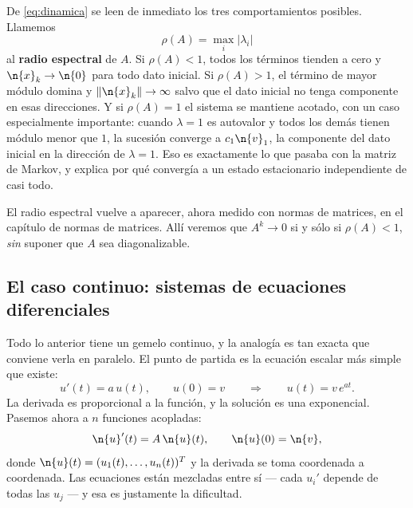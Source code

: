 De \eqref{eq:dinamica} se leen de inmediato los tres comportamientos posibles. Llamemos
\[
\rho(A)=\max_i|\lambda_i|
\]
al \textbf{radio espectral} de $A$. Si $\rho(A)<1$, todos los términos tienden a cero y
$\n{x}_k\to\n{0}$ para todo dato inicial. Si $\rho(A)>1$, el término de mayor módulo
domina y $\|\n{x}_k\|\to\infty$ salvo que el dato inicial no tenga componente en esas
direcciones. Y si $\rho(A)=1$ el sistema se mantiene acotado, con un caso especialmente
importante: cuando $\lambda=1$ es autovalor y todos los demás tienen módulo menor que
$1$, la sucesión converge a $c_1\n{v}_1$, la componente del dato inicial en la dirección
de $\lambda=1$. Eso es exactamente lo que pasaba con la matriz de Markov, y explica por
qué convergía a un estado estacionario independiente de casi todo.

\begin{remark}
El radio espectral vuelve a aparecer, ahora medido con normas de matrices, en el
capítulo de normas de matrices. Allí veremos que $A^k\to0$ si y sólo si
$\rho(A)<1$, \emph{sin} suponer que $A$ sea diagonalizable.
\end{remark}

\subsection*{El caso continuo: sistemas de ecuaciones diferenciales}

Todo lo anterior tiene un gemelo continuo, y la analogía es tan exacta que conviene
verla en paralelo. El punto de partida es la ecuación escalar más simple que existe:
\[
u'(t)=a\,u(t),\qquad u(0)=v
\qquad\Longrightarrow\qquad
u(t)=v\,e^{at}.
\]
La derivada es proporcional a la función, y la solución es una exponencial. Pasemos
ahora a $n$ funciones acopladas:
\[
\n{u}'(t)=A\,\n{u}(t),\qquad \n{u}(0)=\n{v},
\]
donde $\n{u}(t)=(u_1(t),\dots,u_n(t))^T$ y la derivada se toma coordenada a coordenada.
Las ecuaciones están mezcladas entre sí --- cada $u_i'$ depende de todas las $u_j$ ---
y esa es justamente la dificultad.

